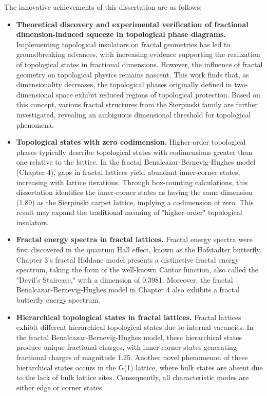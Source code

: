 The innovative achievements of this dissertation are as follows:
\begin{itemize}
    \item \textbf{Theoretical discovery and experimental verification of fractional dimension-induced squeeze in topological phase diagrams.} Implementing topological insulators on fractal geometries has led to groundbreaking advances, with increasing evidence supporting the realization of topological states in fractional dimensions. However, the influence of fractal geometry on topological physics remains nascent. This work finds that, as dimensionality decreases, the topological phases originally defined in two-dimensional space exhibit reduced regions of topological protection. Based on this concept, various fractal structures from the Sierpinski family are further investigated, revealing an ambiguous dimensional threshold for topological phenomena.
    \item \textbf{Topological states with zero codimension.} Higher-order topological phases typically describe topological states with codimensions greater than one relative to the lattice. In the fractal Benalcazar-Bernevig-Hughes model (Chapter 4), gaps in fractal lattices yield abundant inner-corner states, increasing with lattice iterations. Through box-counting calculations, this dissertation identifies the inner-corner states as having the same dimension (1.89) as the Sierpinski carpet lattice, implying a codimension of zero. This result may expand the traditional meaning of "higher-order" topological insulators.
    \item \textbf{Fractal energy spectra in fractal lattices.} Fractal energy spectra were first discovered in the quantum Hall effect, known as the Hofstadter butterfly. Chapter 3's fractal Haldane model presents a distinctive fractal energy spectrum, taking the form of the well-known Cantor function, also called the "Devil's Staircase," with a dimension of 0.3981. Moreover, the fractal Benalcazar-Bernevig-Hughes model in Chapter 4 also exhibits a fractal butterfly energy spectrum.
    \item \textbf{Hierarchical topological states in fractal lattices.} Fractal lattices exhibit different hierarchical topological states due to internal vacancies. In the fractal Benalcazar-Bernevig-Hughes model, these hierarchical states produce unique fractional charges, with inner-corner states generating fractional charges of magnitude 1.25. Another novel phenomenon of these hierarchical states occurs in the G(1) lattice, where bulk states are absent due to the lack of bulk lattice sites. Consequently, all characteristic modes are either edge or corner states.
\end{itemize}

